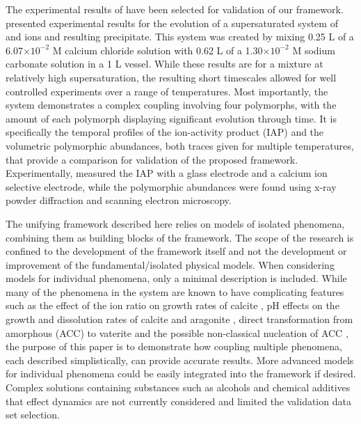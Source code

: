 \documentclass[preprint,3p,a4paper,times,12pt,authoryear]{elsarticle}
\begin{document}
The experimental results of \citet{Ogino1987} have been selected for validation of our framework.  \citeauthor{Ogino1987} presented experimental results for the evolution of a supersaturated system of  and  ions and resulting  precipitate.  This system was created by mixing 0.25 L of a 6.07$\times 10^{-2}$ M calcium chloride solution with 0.62 L of a 1.30$\times 10^{-2}$ M sodium carbonate solution in a 1 L vessel.  While these results are for a mixture at relatively high supersaturation, the resulting short timescales allowed for well controlled experiments over a range of temperatures. Most importantly, the system demonstrates a complex coupling involving four   polymorphs, with the amount of each polymorph displaying significant evolution through time. It is specifically the temporal profiles of the ion-activity product (IAP) and the volumetric polymorphic abundances, both traces given for multiple temperatures, that provide a comparison for validation of the proposed framework.  Experimentally, \citeauthor{Ogino1987} measured the IAP with a glass electrode and a calcium ion selective electrode, while the polymorphic abundances were found using x-ray powder diffraction and scanning electron microscopy.

The unifying framework described here relies on models of isolated phenomena, combining them as building blocks of the framework.  
The scope of the research is confined to the development of the framework itself and not the development or improvement of the fundamental/isolated physical models.  When considering models for individual phenomena, only a minimal description is included.  While many of the phenomena in the  system are known to have complicating features such as the effect of the ion ratio on growth rates of calcite \citep{Lin2005,Stack2010,Gebrehiwet2012,Bracco2013}, pH effects on the growth and dissolution rates of calcite and aragonite \citep{Chou1989,Pokrovsky2009,Ruiz-Agudo2011}, direct transformation from amorphous  (ACC) to vaterite \citep{Rodriguez-Blanco2011,Bots2012} and the possible non-classical nucleation of ACC \citep{Gebauer2008,Gebauer2011,Raiteri2010}, the purpose of this paper is to demonstrate how coupling multiple phenomena, each described simplistically, can provide accurate results.  More advanced models for individual phenomena could be easily integrated into the framework if desired.  Complex solutions containing substances such as alcohols and chemical additives that effect  dynamics are not currently considered and limited the validation data set selection.
\end{document}
